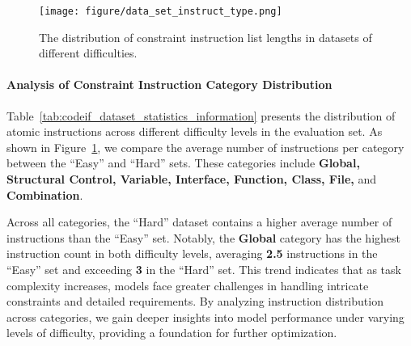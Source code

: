 \begin{table*}[!t]
\centering
\scriptsize
\caption{CodeIF dataset statistics information, showing the distribution of atomic restriction instruction categories under different difficulty classifications.}
\renewcommand{\arraystretch}{1} %
\label{tab:codeif_dataset_statistics_information}
\end{table*}


\begin{figure}
    \centering
    \texttt{[image: figure/data\_set\_instruct\_type.png]}
    \caption{ The distribution of constraint instruction list lengths in datasets of different difficulties.}
    \label{fig:data_set_instruct_type}
\end{figure}

\paragraph{Analysis of Constraint Instruction Category Distribution}

Table~\ref{tab:codeif_dataset_statistics_information} presents the distribution of atomic instructions across different difficulty levels in the evaluation set. As shown in Figure~\ref{fig:data_set_instruct_type}, we compare the average number of instructions per category between the ``Easy'' and ``Hard'' sets. These categories include \textbf{Global, Structural Control, Variable, Interface, Function, Class, File,} and \textbf{Combination}. 

Across all categories, the ``Hard'' dataset contains a higher average number of instructions than the ``Easy'' set. Notably, the \textbf{Global} category has the highest instruction count in both difficulty levels, averaging \textbf{2.5} instructions in the ``Easy'' set and exceeding \textbf{3} in the ``Hard'' set. This trend indicates that as task complexity increases, models face greater challenges in handling intricate constraints and detailed requirements. By analyzing instruction distribution across categories, we gain deeper insights into model performance under varying levels of difficulty, providing a foundation for further optimization.

